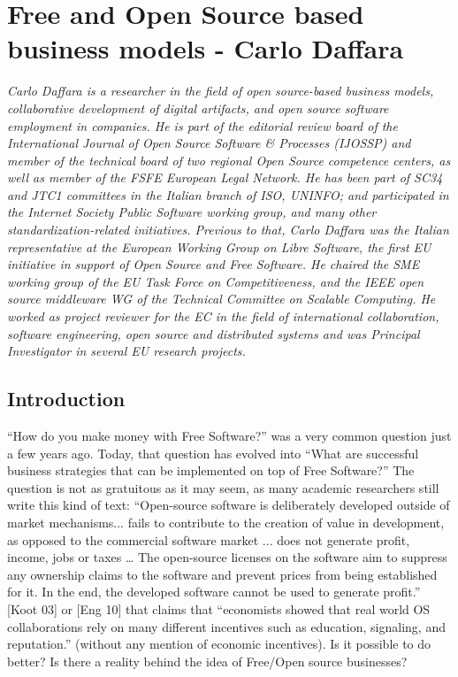 \chapter{Free and Open Source based business models - Carlo Daffara}

\textit{Carlo Daffara is a researcher in the field of open source-based business models, collaborative development of digital artifacts, and open source software employment in companies. He is part of the editorial review board of the International Journal of Open Source Software \& Processes (IJOSSP) and member of the technical board of two regional Open Source competence centers, as well as member of the FSFE European Legal Network. He has been part of SC34 and JTC1 committees in the Italian branch of ISO, UNINFO; and participated in the Internet Society Public Software working group, and many other standardization-related initiatives. Previous to that, Carlo Daffara was the Italian representative at the European Working Group on Libre Software, the first EU initiative in support of Open Source and Free Software. He chaired the SME working group of the EU Task Force on Competitiveness, and the IEEE open source middleware WG of the Technical Committee on Scalable Computing. He worked as project reviewer for the EC in the field of international collaboration, software engineering, open source and distributed systems and was Principal Investigator in several EU research projects.}

\section*{Introduction}

“How do you make money with Free Software?” was a very common question just a few years ago. Today, that question has evolved into “What are successful business strategies that can be implemented on top of Free Software?” The question is not as gratuitous as it may seem, as many academic researchers still write this kind of text: “Open-source software is deliberately developed outside of market mechanisms... fails to contribute to the creation of value in development, as opposed to the commercial software market ... does not generate profit, income, jobs or taxes … The open-source licenses on the software aim to suppress any ownership claims to the software and prevent prices from being established for it. In the end, the developed software cannot be used to generate profit.” [Koot 03] or [Eng 10] that claims that “economists showed that real world OS collaborations rely on many different incentives such as education, signaling, and reputation.” (without any mention of economic incentives). Is it possible to do better? Is there a reality behind the idea of Free/Open source businesses? 

